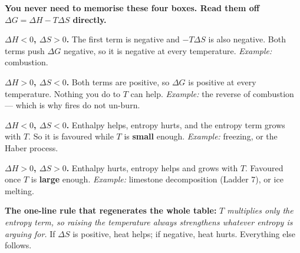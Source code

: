 \documentclass{apchem-worksheet}
\begin{document}
\begin{center}
\end{center}

\begin{workedexample}
\textbf{You never need to memorise these four boxes. Read them off
$\Delta G = \Delta H - T\Delta S$ directly.}

\textbf{$\Delta H < 0$, $\Delta S > 0$.} The first term is negative and
$-T\Delta S$ is also negative. Both terms push $\Delta G$ negative, so
it is negative at every temperature. \emph{Example:} combustion.

\textbf{$\Delta H > 0$, $\Delta S < 0$.} Both terms are positive, so
$\Delta G$ is positive at every temperature. Nothing you do to $T$ can
help. \emph{Example:} the reverse of combustion --- which is why fires
do not un-burn.

\textbf{$\Delta H < 0$, $\Delta S < 0$.} Enthalpy helps, entropy hurts,
and the entropy term grows with $T$. So it is favoured while $T$ is
\textbf{small} enough. \emph{Example:} freezing, or the Haber process.

\textbf{$\Delta H > 0$, $\Delta S > 0$.} Enthalpy hurts, entropy helps
and grows with $T$. Favoured once $T$ is \textbf{large} enough.
\emph{Example:} limestone decomposition (Ladder 7), or ice melting.

\textbf{The one-line rule that regenerates the whole table:}
\emph{$T$ multiplies only the entropy term, so raising the temperature
always strengthens whatever entropy is arguing for.} If $\Delta S$ is
positive, heat helps; if negative, heat hurts. Everything else follows.
\end{workedexample}
\end{document}
